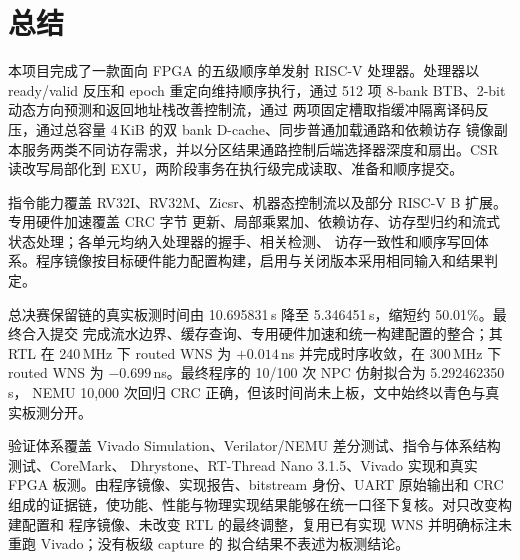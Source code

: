 \clearpage
\section{总结}

本项目完成了一款面向 FPGA 的五级顺序单发射 RISC-V 处理器。处理器以 ready/valid 反压和 epoch
重定向维持顺序执行，通过 512 项 8-bank BTB、2-bit 动态方向预测和返回地址栈改善控制流，通过
两项固定槽取指缓冲隔离译码反压，通过总容量 4\,KiB 的双 bank D-cache、同步普通加载通路和依赖访存
镜像副本服务两类不同访存需求，并以分区结果通路控制后端选择器深度和扇出。CSR 读改写局部化到
EXU，两阶段事务在执行级完成读取、准备和顺序提交。

指令能力覆盖 RV32I、RV32M、Zicsr、机器态控制流以及部分 RISC-V B 扩展。专用硬件加速覆盖 CRC 字节
更新、局部乘累加、依赖访存、访存型归约和流式状态处理；各单元均纳入处理器的握手、相关检测、
访存一致性和顺序写回体系。程序镜像按目标硬件能力配置构建，启用与关闭版本采用相同输入和结果判定。

总决赛保留链的真实板测时间由 10.695831\,s 降至 5.346451\,s，缩短约 50.01\%。最终合入提交
 完成流水边界、缓存查询、专用硬件加速和统一构建配置的整合；其 RTL 在
240\,MHz 下 routed WNS 为 $+0.014$\,ns 并完成时序收敛，在 300\,MHz 下 routed WNS 为
$-0.699$\,ns。最终程序的 10/100 次 NPC 仿射拟合为 5.292462350\,s，
NEMU 10,000 次回归 CRC 正确，但该时间尚未上板，文中始终以青色与真实板测分开。

验证体系覆盖 Vivado Simulation、Verilator/NEMU 差分测试、指令与体系结构测试、CoreMark、
Dhrystone、RT-Thread Nano 3.1.5、Vivado 实现和真实 FPGA 板测。由程序镜像、实现报告、bitstream 身份、UART
原始输出和 CRC 组成的证据链，使功能、性能与物理实现结果能够在统一口径下复核。对只改变构建配置和
程序镜像、未改变 RTL 的最终调整，复用已有实现 WNS 并明确标注未重跑 Vivado；没有板级 capture 的
拟合结果不表述为板测结论。
